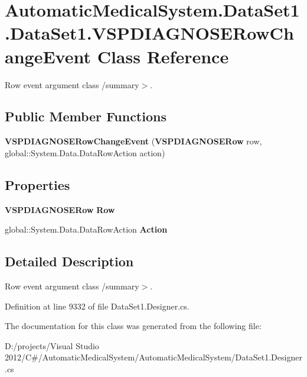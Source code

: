 \section{AutomaticMedicalSystem.DataSet1.DataSet1.VSPDIAGNOSERowChangeEvent Class Reference}
\label{class_automatic_medical_system_1_1_data_set1_1_1_v_s_p_d_i_a_g_n_o_s_e_row_change_event}
Row event argument class /summary$>$.  


\subsection*{Public Member Functions}
\begin{CompactItemize}
\item 
\textbf{VSPDIAGNOSERowChangeEvent} ({\bf VSPDIAGNOSERow} row, global::System.Data.DataRowAction action)\label{class_automatic_medical_system_1_1_data_set1_1_1_v_s_p_d_i_a_g_n_o_s_e_row_change_event_23690e4ab856ef104a590a20f3f866f4}

\end{CompactItemize}
\subsection*{Properties}
\begin{CompactItemize}
\item 
{\bf VSPDIAGNOSERow} \textbf{Row}\hspace{0.3cm}{\tt  [get]}\label{class_automatic_medical_system_1_1_data_set1_1_1_v_s_p_d_i_a_g_n_o_s_e_row_change_event_1e168e067db5f64854e5eb89e29cc999}

\item 
global::System.Data.DataRowAction \textbf{Action}\hspace{0.3cm}{\tt  [get]}\label{class_automatic_medical_system_1_1_data_set1_1_1_v_s_p_d_i_a_g_n_o_s_e_row_change_event_bdd405e7f97b5a1dc3ce3ce2d2c1204f}

\end{CompactItemize}


\subsection{Detailed Description}
Row event argument class /summary$>$. 

Definition at line 9332 of file DataSet1.Designer.cs.

The documentation for this class was generated from the following file:\begin{CompactItemize}
\item 
D:/projects/Visual Studio 2012/C\#/AutomaticMedicalSystem/AutomaticMedicalSystem/DataSet1.Designer.cs\end{CompactItemize}
